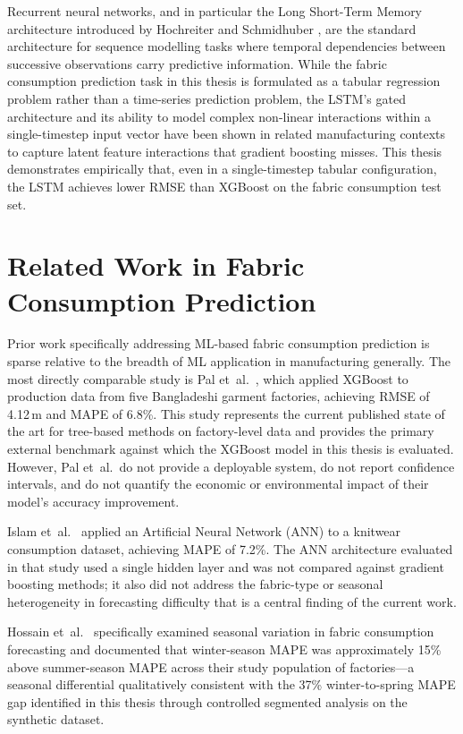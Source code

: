 Recurrent neural networks, and in particular the Long Short-Term Memory architecture introduced by Hochreiter and Schmidhuber \cite{hochreiter1997long}, are the standard architecture for sequence modelling tasks where temporal dependencies between successive observations carry predictive information. While the fabric consumption prediction task in this thesis is formulated as a tabular regression problem rather than a time-series prediction problem, the LSTM's gated architecture and its ability to model complex non-linear interactions within a single-timestep input vector have been shown in related manufacturing contexts to capture latent feature interactions that gradient boosting misses. This thesis demonstrates empirically that, even in a single-timestep tabular configuration, the LSTM achieves lower RMSE than XGBoost on the fabric consumption test set.

\secdiv
\section{Related Work in Fabric Consumption Prediction}
Prior work specifically addressing ML-based fabric consumption prediction is sparse relative to the breadth of ML application in manufacturing generally. The most directly comparable study is Pal et~al.\ \cite{pal2022gradient}, which applied XGBoost to production data from five Bangladeshi garment factories, achieving RMSE of 4.12\,m and MAPE of 6.8\%. This study represents the current published state of the art for tree-based methods on factory-level data and provides the primary external benchmark against which the XGBoost model in this thesis is evaluated. However, Pal et~al.\ do not provide a deployable system, do not report confidence intervals, and do not quantify the economic or environmental impact of their model's accuracy improvement.

Islam et~al.\ \cite{islam2021ann} applied an Artificial Neural Network (ANN) to a knitwear consumption dataset, achieving MAPE of 7.2\%. The ANN architecture evaluated in that study used a single hidden layer and was not compared against gradient boosting methods; it also did not address the fabric-type or seasonal heterogeneity in forecasting difficulty that is a central finding of the current work.

Hossain et~al.\ \cite{hossain2020seasonal} specifically examined seasonal variation in fabric consumption forecasting and documented that winter-season MAPE was approximately 15\% above summer-season MAPE across their study population of factories---a seasonal differential qualitatively consistent with the 37\% winter-to-spring MAPE gap identified in this thesis through controlled segmented analysis on the synthetic dataset.

